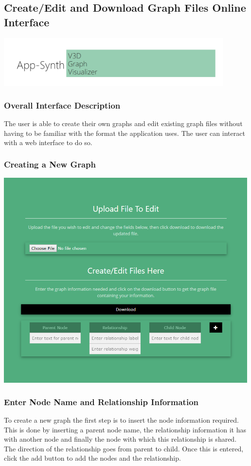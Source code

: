\documentclass[english]{article}
\begin{document}
\subsection{Create/Edit and Download Graph Files Online Interface}

\includegraphics[width=450px]{InterfaceScreenshots/InterfaceCoverPage.PNG}

\subsubsection{Overall Interface Description}
The user is able to create their own graphs and edit existing graph files without having to be familiar with the format the application uses. The user can interact with a web interface to do so.

\subsubsection{Creating a New Graph}

\includegraphics[width=500px]{InterfaceScreenshots/EmptyInfo.PNG}

\subsubsection{Enter Node Name and Relationship Information}
To create a new graph the first step is to insert the node information required. This is done by inserting a parent node name, the relationship information it has with another node and finally the node with which this relationship is shared. The direction of the relationship goes from parent to child. Once this is entered, click the add button to add the nodes and the relationship.
\end{document}
